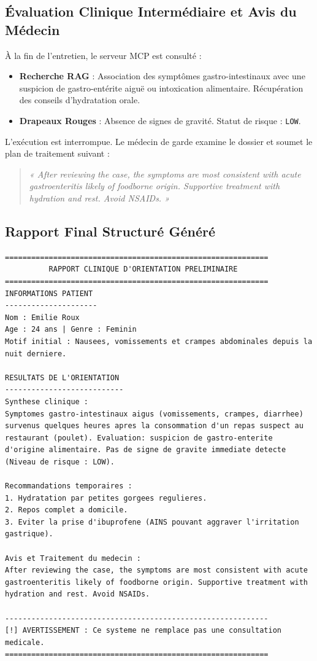 \documentclass[11pt,a4paper]{report}
\begin{document}
\subsection{Évaluation Clinique Intermédiaire et Avis du Médecin}
À la fin de l'entretien, le serveur MCP est consulté :
\begin{itemize}
    \item \textbf{Recherche RAG} : Association des symptômes gastro-intestinaux avec une suspicion de gastro-entérite aiguë ou intoxication alimentaire. Récupération des conseils d'hydratation orale.
    \item \textbf{Drapeaux Rouges} : Absence de signes de gravité. Statut de risque : \texttt{LOW}.
\end{itemize}
L'exécution est interrompue. Le médecin de garde examine le dossier et soumet le plan de traitement suivant :
\begin{quote}
    \textit{« After reviewing the case, the symptoms are most consistent with acute gastroenteritis likely of foodborne origin. Supportive treatment with hydration and rest. Avoid NSAIDs. »}
\end{quote}

\subsection{Rapport Final Structuré Généré}
\begin{lstlisting}[basicstyle=\ttfamily\tiny, frame=single, caption=Rapport final stocke en base pour Emilie Roux]
============================================================
          RAPPORT CLINIQUE D'ORIENTATION PRELIMINAIRE
============================================================
INFORMATIONS PATIENT
---------------------
Nom : Emilie Roux
Age : 24 ans | Genre : Feminin
Motif initial : Nausees, vomissements et crampes abdominales depuis la nuit derniere.

RESULTATS DE L'ORIENTATION
---------------------------
Synthese clinique :
Symptomes gastro-intestinaux aigus (vomissements, crampes, diarrhee) survenus quelques heures apres la consommation d'un repas suspect au restaurant (poulet). Evaluation: suspicion de gastro-enterite d'origine alimentaire. Pas de signe de gravite immediate detecte (Niveau de risque : LOW).

Recommandations temporaires :
1. Hydratation par petites gorgees regulieres.
2. Repos complet a domicile.
3. Eviter la prise d'ibuprofene (AINS pouvant aggraver l'irritation gastrique).

Avis et Traitement du medecin :
After reviewing the case, the symptoms are most consistent with acute gastroenteritis likely of foodborne origin. Supportive treatment with hydration and rest. Avoid NSAIDs.

------------------------------------------------------------
[!] AVERTISSEMENT : Ce systeme ne remplace pas une consultation medicale.
============================================================
\end{lstlisting}
\end{document}
